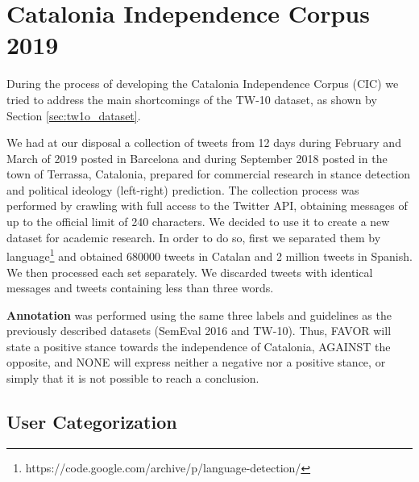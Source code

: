 \documentclass[10pt, a4paper]{article}
\begin{document}







\section{Catalonia Independence Corpus 2019}\label{sec:independence}

During the process of developing the Catalonia Independence Corpus (CIC) we tried to address the main shortcomings of the TW-10 dataset, as shown by Section \ref{sec:tw1o_dataset}.

We had at our disposal a collection of tweets from 12 days during February and March of 2019 posted in Barcelona and during September 2018 posted in the town of Terrassa, Catalonia, prepared for commercial research in stance detection and political ideology (left-right) prediction. The collection process was performed by crawling with full access to the Twitter API, obtaining messages of up to the official limit of 240 characters. We decided to use it to create a new dataset for academic research. In order to do so, first we separated them by language\footnote{https://code.google.com/archive/p/language-detection/} and obtained 680000 tweets in Catalan and 2 million tweets in Spanish. We then processed each set separately. We discarded tweets with identical messages and tweets containing less than three words.

\textbf{Annotation} was performed using the same three labels and guidelines as the previously described datasets (SemEval 2016 and TW-10). Thus, FAVOR will state a positive stance towards the independence of Catalonia, AGAINST the opposite, and NONE will express neither a negative nor a positive stance, or simply that it is not possible to reach a conclusion.

\subsection{User Categorization}\label{sec:categ-at-user}
\end{document}
